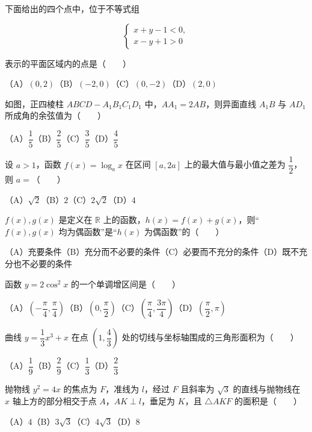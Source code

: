 \begin{question}
下面给出的四个点中，位于不等式组

\nopagebreak[4]
\[
\begin{cases}
x+y-1<0,\\
x-y+1>0
\end{cases}
\]

表示的平面区域内的点是\mbox{（　　）}

（A）$(0,2)$\quad（B）$(-2,0)$\quad（C）$(0,-2)$\quad（D）$(2,0)$

\Needspace{0.4\textheight}
\end{question}
\begin{question}
如图，正四棱柱 $ABCD-A_1B_1C_1D_1$ 中，$AA_1=2AB$，则异面直线 $A_1B$ 与 $AD_1$ 所成角的余弦值为\mbox{（　　）}
\nopagebreak[4]
\begin{center}\end{center}
\nopagebreak[4]
（A）$\dfrac15$\quad（B）$\dfrac25$\quad（C）$\dfrac35$\quad（D）$\dfrac45$

\end{question}
\begin{question}
设 $a>1$，函数 $f(x)=\log_a x$ 在区间 $[a,2a]$ 上的最大值与最小值之差为 $\dfrac12$，则 $a=$\mbox{（　　）}

（A）$\sqrt2$\quad（B）$2$\quad（C）$2\sqrt2$\quad（D）$4$

\end{question}
\begin{question}
$f(x),g(x)$ 是定义在 $\mathbb R$ 上的函数，$h(x)=f(x)+g(x)$，则“$f(x),g(x)$ 均为偶函数”是“$h(x)$ 为偶函数”的\mbox{（　　）}

（A）充要条件\quad（B）充分而不必要的条件\quad（C）必要而不充分的条件\quad（D）既不充分也不必要的条件

\end{question}
\begin{question}
函数 $y=2\cos^2x$ 的一个单调增区间是\mbox{（　　）}

（A）$\left(-\dfrac\pi4,\dfrac\pi4\right)$\quad（B）$\left(0,\dfrac\pi2\right)$\quad（C）$\left(\dfrac\pi4,\dfrac{3\pi}4\right)$\quad（D）$\left(\dfrac\pi2,\pi\right)$

\end{question}
\begin{question}
曲线 $y=\dfrac13x^3+x$ 在点 $\left(1,\dfrac43\right)$ 处的切线与坐标轴围成的三角形面积为\mbox{（　　）}

（A）$\dfrac19$\quad（B）$\dfrac29$\quad（C）$\dfrac13$\quad（D）$\dfrac23$

\end{question}
\begin{question}
抛物线 $y^2=4x$ 的焦点为 $F$，准线为 $l$，经过 $F$ 且斜率为 $\sqrt3$ 的直线与抛物线在 $x$ 轴上方的部分相交于点 $A$，$AK\perp l$，垂足为 $K$，且 $\triangle AKF$ 的面积是\mbox{（　　）}

（A）$4$\quad（B）$3\sqrt3$\quad（C）$4\sqrt3$\quad（D）$8$

\end{question}

